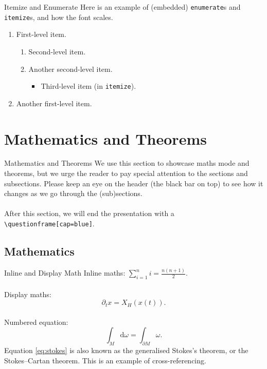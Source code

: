 \documentclass{beamer}
\begin{document}
\begin{frame}{Itemize and Enumerate}
    Here is an example of (embedded) \texttt{enumerate}s and \texttt{itemize}s, and how the font scales.
    \begin{enumerate}
        \item First-level item.
        \begin{enumerate}
            \item Second-level item.
            \item Another second-level item.
            \begin{itemize}
                \item Third-level item (in \texttt{itemize}).
            \end{itemize}
        \end{enumerate}
        \item Another first-level item.
    \end{enumerate}
\end{frame}

\section{Mathematics and Theorems}

\begin{frame}{Mathematics and Theorems}
    We use this section to showcase maths mode and theorems, but we urge the reader to pay special attention to the sections and subsections. Please keep an eye on the header (the black bar on top) to see how it changes as we go through the (sub)sections.\\~\\
    After this section, we will end the presentation with a \texttt{\textbackslash questionframe[cap=blue]}.
\end{frame}

\subsection{Mathematics}

\begin{frame}{Inline and Display Math}
    Inline maths: \(\sum_{i=1}^n i = \frac{n(n+1)}{2}\).\\~\\
    Display maths:
    \[
        \partial_t x = X_H(x(t)).
    \]~\\
    Numbered equation:
    \begin{equation}
        \int_M\mathrm{d}\omega = \int_{\partial M}\omega.
        \label{eq:stokes}
    \end{equation}
    Equation \eqref{eq:stokes} is also known as the generalised Stokes's theorem, or the Stokes--Cartan theorem. This is an example of cross-referencing.
\end{frame}
\end{document}
